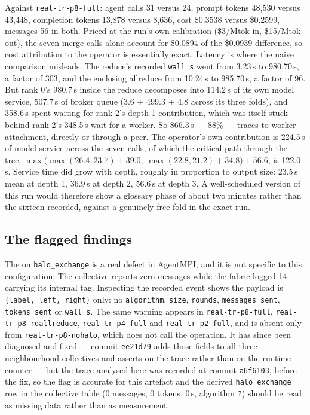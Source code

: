 \documentclass[11pt]{article}
\begin{document}
Against \texttt{real-tr-p8-full}: agent calls 31 versus 24, prompt tokens 48{,}530 versus
43{,}448, completion tokens 13{,}878 versus 8{,}636, cost \$0.3538 versus \$0.2599, messages 56
in both. Priced at the run's own calibration (\$3/Mtok in, \$15/Mtok out), the seven merge calls
alone account for \$0.0894 of the \$0.0939 difference, so cost attribution to the operator is
essentially exact. Latency is where the naive comparison misleads. The reduce's recorded
\texttt{wall\_s} went from 3.23\,s to 980.70\,s, a factor of 303, and the enclosing allreduce
from 10.24\,s to 985.70\,s, a factor of 96. But rank 0's 980.7\,s inside the reduce decomposes
into 114.2\,s of its own model service, 507.7\,s of broker queue (3.6 + 499.3 + 4.8 across its
three folds), and 358.6\,s spent waiting for rank 2's depth-1 contribution, which was itself
stuck behind rank 2's 348.5\,s wait for a worker. So 866.3\,s --- 88\% --- traces to worker
attachment, directly or through a peer. The operator's own contribution is 224.5\,s of model
service across the seven calls, of which the critical path through the tree,
$\max\!\big(\max(26.4,23.7)+39.0,\ \max(22.8,21.2)+34.8\big)+56.6$, is 122.0\,s. Service time
did grow with depth, roughly in proportion to output size: 23.5\,s mean at depth 1, 36.9\,s at
depth 2, 56.6\,s at depth 3. A well-scheduled version of this run would therefore show a glossary
phase of about two minutes rather than the sixteen recorded, against a genuinely free fold in the
exact run.

\subsection{The flagged findings}

The  on \texttt{halo\_exchange} is a real defect in AgentMPI, and it is not
specific to this configuration. The collective reports zero messages while the fabric logged 14
carrying its internal tag. Inspecting the recorded event shows the payload is
\texttt{\{label, left, right\}} only: no \texttt{algorithm}, \texttt{size}, \texttt{rounds},
\texttt{messages\_sent}, \texttt{tokens\_sent} or \texttt{wall\_s}. The same warning appears in
\texttt{real-tr-p8-full}, \texttt{real-tr-p8-rdallreduce}, \texttt{real-tr-p4-full} and
\texttt{real-tr-p2-full}, and is absent only from \texttt{real-tr-p8-nohalo}, which does not call
the operation. It has since been diagnosed and fixed --- commit \texttt{ee21d79} adds those
fields to all three neighbourhood collectives and asserts on the trace rather than on the runtime
counter --- but the trace analysed here was recorded at commit \texttt{a6f6103}, before the fix,
so the flag is accurate for this artefact and the derived \texttt{halo\_exchange} row in the
collective table (0 messages, 0 tokens, 0\,s, algorithm \texttt{?}) should be read as missing
data rather than as measurement.
\end{document}
